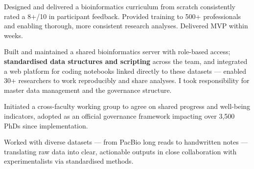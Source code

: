 \documentclass[a4paper,10pt]{article}
\begin{document}
{\begin{adjustbox}{valign=t}
\begin{minipage}[t]{0.6\textwidth}
\begin{description}
  \item Designed and delivered a bioinformatics curriculum from scratch consistently rated a 8+/10 in participant feedback.
    Provided training to 500+ professionals and enabling thorough, more consistent research analyses. 
    Delivered MVP within weeks.
\item Built and maintained a shared bioinformatics server with role-based access; 
      \textbf{standardised data structures and scripting} across the team, and integrated a web platform 
      for coding notebooks linked directly to these datasets — enabled 30{+} researchers to work reproducibly and share analyses.
      I took responsibility for master data management and the governance structure.
  \item Initiated a cross-faculty working group to agree on shared progress and well-being indicators, 
    adopted as an official governance framework impacting over 3,500 PhDs since implementation.
  \item Worked with diverse datasets — from PacBio long reads to handwritten notes 
    — translating raw data into clear, actionable outputs in close collaboration with experimentalists 
    via standardised methods.
\end{description}


\end{minipage}%
\end{adjustbox}%
}
\newpage
\end{document}
